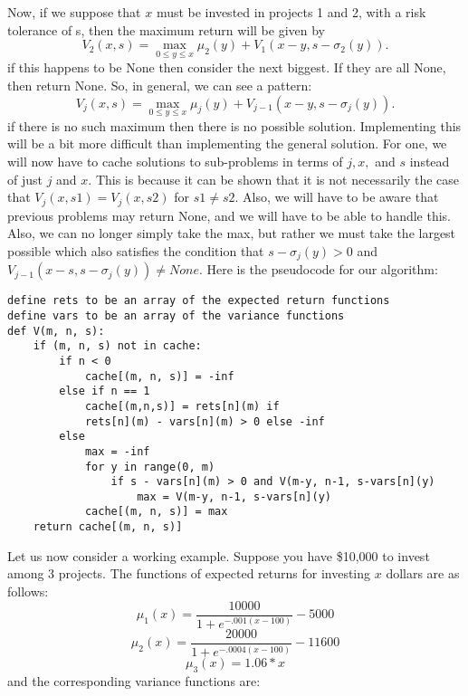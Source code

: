 \documentclass{article}
\begin{document}
Now, if we suppose that $x$ must be invested in projects 1 and 2, with a risk tolerance of s, then the maximum return will be given by 
$$V_{2}(x, s) = \max_{0\leq y\leq x} \mu_{2}(y) + V_{1}(x-y, s-\sigma_{2}(y)).$$
if this happens to be None then consider the next biggest.  If they are all None, then return None.
\newline
So, in general, we can see a pattern:
$$V_{j}(x, s) = \max_{0\leq y\leq x} \mu_{j}(y) + V_{j-1}(x-y,  s-\sigma_{j}(y)).$$
if there is no such maximum then there is no possible solution.
\newline
Implementing this will be a bit more difficult than implementing the general solution.  For one, we will now have to cache solutions to sub-problems in terms of $j, x,$ and $s$ instead of just $j$ and $x$.  This is because it can be shown that it is not necessarily the case that $V_{j}(x, s1) = V_{j}(x, s2)$ for $s1 \neq s2$.
Also, we will have to be aware that previous problems may return None, and we will have to be able to handle this. Also, we can no longer simply take the max, but rather we must take the largest possible which also satisfies the condition that $s-\sigma_{j}(y)>0$ and $V_{j-1}(x-s, s-\sigma_{j}(y)) \neq None$. 
\newline
Here is the pseudocode for our algorithm:
\newline
\begin{lstlisting}
define rets to be an array of the expected return functions
define vars to be an array of the variance functions
def V(m, n, s):
    if (m, n, s) not in cache:
        if n < 0  
            cache[(m, n, s)] = -inf
        else if n == 1  
            cache[(m,n,s)] = rets[n](m) if 
            rets[n](m) - vars[n](m) > 0 else -inf
        else 
            max = -inf
            for y in range(0, m)
                if s - vars[n](m) > 0 and V(m-y, n-1, s-vars[n](y)
                    max = V(m-y, n-1, s-vars[n](y)
            cache[(m, n, s)] = max
    return cache[(m, n, s)]

\end{lstlisting}
\newline
\newline
\newline
Let us now consider a working example.  Suppose you have \$10,000 to invest among 3 projects.  The functions of expected returns for investing $x$ dollars are as follows:
$$\mu_{1}(x) = \dfrac{10000}{1+e^{-.001(x-100)}}-5000$$
$$\mu_{2}(x) = \dfrac{20000}{1+e^{-.0004(x-100)}}-11600$$
$$\mu_{3}(x) = 1.06*x$$
and the corresponding variance functions are:
\end{document}
